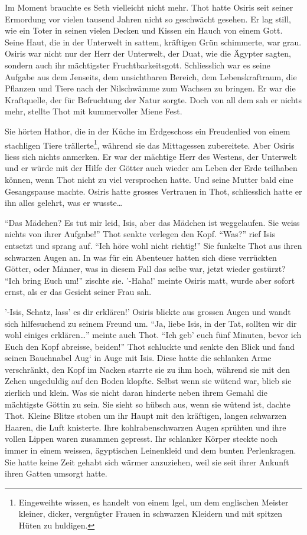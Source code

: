 \documentclass[11pt,titlepage,a5paper]{book}
\begin{document}
Im Moment brauchte es Seth vielleicht nicht mehr. Thot hatte Osiris seit seiner Ermordung vor vielen tausend Jahren nicht so geschwächt gesehen. Er lag still, wie ein Toter in seinen vielen Decken und Kissen ein Hauch von einem Gott. Seine Haut, die in der Unterwelt in sattem, kräftigen Grün schimmerte, war grau. Osiris war nicht nur der Herr der Unterwelt, der Duat, wie die Ägypter sagten, sondern auch ihr mächtigster Fruchtbarkeitsgott. Schliesslich war es seine Aufgabe aus dem Jenseits, dem unsichtbaren Bereich, dem Lebenskraftraum, die Pflanzen und Tiere nach der Nilschwämme zum Wachsen zu bringen. Er war die Kraftquelle, der für Befruchtung der Natur sorgte. Doch von all dem sah er nichts mehr, stellte Thot mit kummervoller Miene Fest.

Sie hörten Hathor, die in der Küche im Erdgeschoss ein Freudenlied von einem stachligen Tiere trällerte\footnote{Eingeweihte wissen, es handelt von einem Igel, um dem englischen Meister kleiner, dicker, vergnügter Frauen in schwarzen Kleidern und mit spitzen Hüten zu huldigen.}, während sie das Mittagessen zubereitete. Aber Osiris liess sich nichts anmerken. Er war der mächtige Herr des Westens, der Unterwelt und er würde mit der Hilfe der Götter auch wieder am Leben der Erde teilhaben können, wenn Thot nicht zu viel versprochen hatte. Und seine Mutter bald eine Gesangspause machte. Osiris hatte grosses Vertrauen in Thot, schliesslich hatte er ihn alles gelehrt, was er wusste\dots
 
 "`Das Mädchen? Es tut mir leid, Isis, aber das Mädchen ist weggelaufen. Sie weiss nichts von ihrer Aufgabe!"' Thot senkte verlegen den Kopf. "`Was?"' rief Isis entsetzt und sprang auf. "`Ich höre wohl nicht richtig!"' Sie funkelte Thot aus ihren schwarzen Augen an. In was für ein Abenteuer hatten sich diese verrückten Götter, oder Männer, was in diesem Fall das selbe war, jetzt wieder gestürzt? "`Ich bring Euch um!"' zischte sie. '-Haha!' meinte Osiris matt, wurde aber sofort ernst, als er das Gesicht seiner Frau sah. 
 
'-Isis, Schatz, lass' es dir erklären!' Osiris blickte aus grossen Augen und wandt sich hilfesuchend zu seinem Freund um. "`Ja, liebe Isis, in der Tat, sollten wir dir wohl einiges erklären\dots"' meinte auch Thot. "`Ich geb' euch fünf Minuten, bevor ich Euch den Kopf abreisse, beiden!"' Thot schluckte und senkte den Blick und fand seinen Bauchnabel Aug` in Auge mit Isis. Diese hatte die schlanken Arme verschränkt, den Kopf im Nacken starrte sie zu ihm hoch, während sie mit den Zehen ungeduldig auf den Boden klopfte. Selbst wenn sie wütend war, blieb sie zierlich und klein. Was sie nicht daran hinderte neben ihrem Gemahl die mächtigste Göttin zu sein. Sie sieht so hübsch aus, wenn sie wütend ist, dachte Thot. Kleine Blitze stoben um ihr Haupt mit den kräftigen, langen schwarzen Haaren, die Luft knisterte. Ihre kohlrabenschwarzen Augen sprühten und ihre vollen Lippen waren zusammen gepresst. Ihr schlanker Körper steckte noch immer in einem weissen, ägyptischen Leinenkleid und dem bunten Perlenkragen. Sie hatte keine Zeit gehabt sich wärmer anzuziehen, weil sie seit ihrer Ankunft ihren Gatten umsorgt hatte.
 
\end{document}
